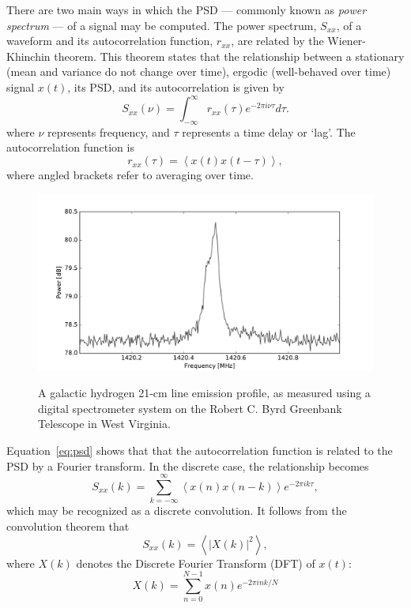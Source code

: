 \documentclass{ws-rv961x669}
\begin{document}
There are two main ways in which the PSD --- commonly known as \emph{power spectrum} --- of a signal may be computed. The power spectrum, $S_{xx}$, of a waveform and its autocorrelation function,  $r_{xx}$, are related by the Wiener-Khinchin theorem. This theorem states that the relationship between a stationary (mean and variance do not change over time), ergodic (well-behaved over time) signal $x(t)$, its PSD, and its autocorrelation is given by
\begin{equation}
S_{xx}(\nu)=\int_{-\infty}^{\infty}r_{xx}(\tau)e^{-2\pi i\nu\tau}d\tau.
\label{eq:psd}
\end{equation}
where $\nu$ represents frequency, and $\tau$ represents a time delay or `lag'. The autocorrelation function is
\begin{equation}
r_{xx}(\tau)=\left\langle x(t)x(t-\tau)\right\rangle,
\end{equation}
where angled brackets refer to averaging over time. 

\begin{figure}[t]
 \centering
 \includegraphics[width=\textwidth]{./figures/hydrogen.pdf}
 \label{fig:hydrogen}
 \caption{A galactic hydrogen 21-cm line emission profile, as measured using a digital spectrometer system on the Robert C. Byrd Greenbank Telescope in West Virginia.}
\end{figure}

Equation~\ref{eq:psd} shows that that the autocorrelation function is related to the PSD by a Fourier transform. In the discrete case, the relationship becomes
\begin{equation}
S_{xx}(k)=\sum_{k=-\infty}^{\infty}\left\langle x(n)x(n-k)\right\rangle e^{-2\pi ik\tau},\label{eq:discrete-wiener}
\end{equation}
which may be recognized as a discrete convolution. It follows from the convolution theorem that 
\begin{equation}
S_{xx}(k)=\left\langle \left|X(k)\right|^{2}\right\rangle ,\label{eq:discrete-pow}
\end{equation}
where $X(k)$ denotes the Discrete Fourier Transform (DFT) of $x(t)$:
\begin{equation}
X(k)=\sum_{n=0}^{N-1}x(n)e^{-2\pi ink/N}\label{eq:dft1}
\end{equation}
\end{document}
